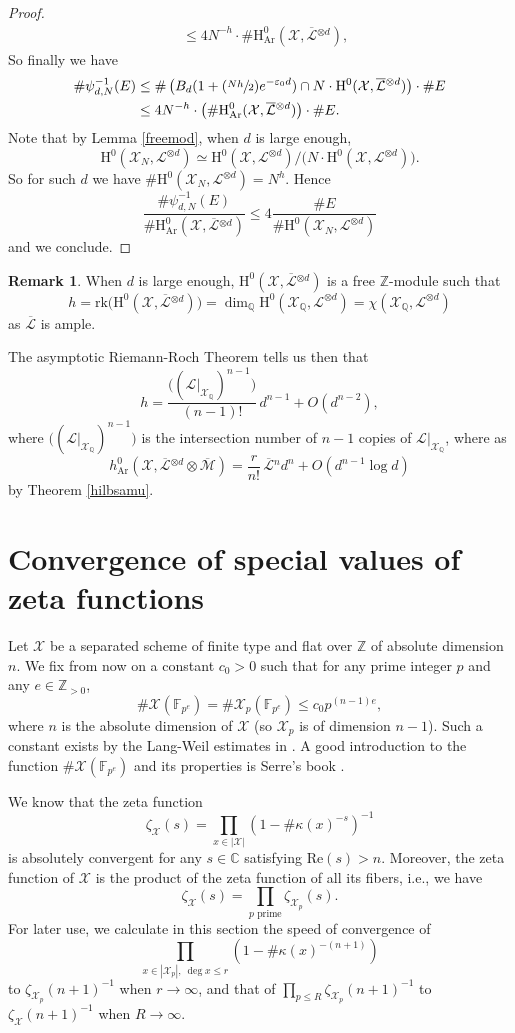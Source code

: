 \documentclass[11pt]{article}
\newcommand{\ie}{i.e.,\xspace}
\numberwithin{equation}{section}
\newcommand{\Psfrac}[2]{(\sfrac{#1}{#2})}
\theoremstyle{plain}
\theoremstyle{definition}
\newtheorem*{rmq}{Remark}
\newcommand{\ho}{\mathrm{H}}
\newcommand{\X}{\mathcal{X}}
\newcommand{\Li}{\overline{\mathcal{L}}{}}
\newcommand{\li}{\mathcal{L}}
\newcommand{\Q}{\mathbb{Q}}
\newcommand{\Z}{\mathbb{Z}}
\newcommand{\bbC}{\mathbb{C}}
\newcommand{\F}{\mathbb{F}}
\begin{document}
\begin{proof}[Proof]
\begin{align*}
&\leq 4N^{-h}\cdot \#\ho^0_{\mathrm{Ar}}(\X,\Li^{\otimes d}),
\end{align*}
So finally we have
\begin{align*}
\#\psi_{d,N}^{-1}(E)&\leq \#\left(B_d(1+\Psfrac{Nh}{2}e^{-\varepsilon_0 d}) \cap N\cdot \ho^0(\X,\Li^{\otimes d}) \right)\cdot \#E\\
&\leq 4N^{-h}\cdot \left(\#\ho^0_{\mathrm{Ar}}(\X,\Li^{\otimes d})\right)\cdot \#E.
\end{align*}
Note that by Lemma \ref{freemod}, when $d$ is large enough,
\[
\ho^0(\X_N,\li^{\otimes d})\simeq\ho^0(\X,\li^{\otimes d})/\big(N\cdot \ho^0(\X,\li^{\otimes d})\big).
\]
So for such $d$ we have $\#\ho^0(\X_{N},\li^{\otimes d})=N^{h}$. Hence
\[
\frac{\#\psi_{d,N}^{-1}(E)}{\#\ho^0_{\mathrm{Ar}}(\X,\Li^{\otimes d})}\leq 4\frac{\#E}{\#\ho^0(\X_{N},\li^{\otimes d})}
\]
and we conclude.
\end{proof}

\begin{rmq}
When $d$ is large enough, $\ho^0 (\X,\Li^{\otimes d})$ is a free $\Z$-module such that
\[
h=\mathrm{rk}\big(\ho^0(\X,\Li^{\otimes d})\big)=\dim_{\Q}\ho^0(\X_{\Q},\li^{\otimes d})=\chi(\X_{\Q}, \li^{\otimes d})
\]
as $\Li$ is ample.

The asymptotic Riemann-Roch Theorem tells us then that
\[
h=\frac{\big((\li|_{\X_{\Q}})^{n-1} \big)}{(n-1)!}\, d^{n-1}+O(d^{n-2}),
\]
where $\big((\li|_{\X_{\Q}})^{n-1} \big)$ is the intersection number of $n-1$ copies of $\li |_{\X_\Q}$, where as
\[
h^0_{\mathrm{Ar}}(\X,\Li^{\otimes d}\otimes \overline{\mathcal{M}})= \frac{r}{n!}\,\Li^{n} d^n+O(d^{n-1}\log d)
\]
by Theorem \ref{hilbsamu}.
\end{rmq}

\section{Convergence of special values of zeta functions}\label{c0}
Let $\X$ be a separated scheme of finite type and flat over $\Z$ of absolute dimension~$n$. We fix from now on a constant $c_0>0$ such that for any prime integer $p$ and any $e\in \Z_{>0}$,
\[
\#\X(\F_{p^e})=\#\X_{p}(\F_{p^e})\leq c_0p^{(n-1)e},
\]
where $n$ is the absolute dimension of $\X$ (so $\X_p$ is of dimension $n-1$). Such a constant exists by the Lang-Weil estimates in \cite{LW54}. A good introduction to the function $\#\X(\F_{p^e})$ and its properties is Serre's book \cite{Se12}.

We know that the zeta function
\[
\zeta_{\X}(s)= \prod_{x\in |\X|}(1-\#\kappa(x)^{-s})^{-1}
\]
is absolutely convergent for any $s\in \bbC$ satisfying $\mathrm{Re}(s)>n$. Moreover, the zeta function of $\X$ is the product of the zeta function of all its fibers, \ie we have
\[
\zeta_{\X}(s)=\prod_{p\text{ prime}} \zeta_{\X_p}(s).
\]
For later use, we calculate in this section the speed of convergence of
\[
\prod_{x\in |\X_p|,\ \deg x\leq r}(1-\#\kappa(x)^{-(n+1)})
\]
to $\zeta_{\X_p}(n+1)^{-1}$ when $r\to \infty$, and that of $\prod_{p\leq R} \zeta_{\X_p}(n+1)^{-1}$ to $\zeta_{\X}(n+1)^{-1}$ when $R\to \infty$.
\end{document}
